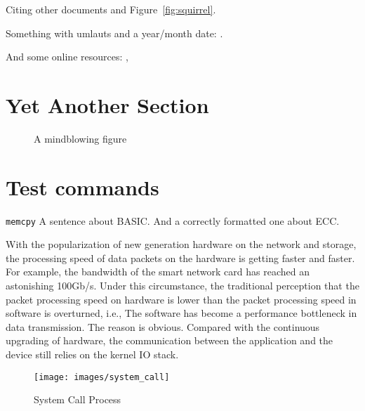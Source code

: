 Citing \cite{bellard2005qfa} other documents \cite{bellard2005qfa, boileau06}
and Figure~\ref{fig:squirrel}.

Something with umlauts and a year/month date:
\cite{becher04:_feurig_hacken_mit_firew}.

And some online resources: \cite{green04}, \cite{patent:4819234}

\section{Yet Another Section}


\begin{figure}[tbp]
 \caption{A mindblowing figure}
 \label{fig:todo}
\end{figure}

\section{Test commands}

\drops \LLinux \NOVA \QEMU
\texttt{memcpy}
A sentence about BASIC. And a correctly formatted one about ECC\@.



With the popularization of new generation hardware on the network and storage, the processing speed 
of data packets on the hardware is getting faster and faster. For example, the bandwidth of the smart
network card has reached an astonishing 100Gb/s. Under this circumstance, the traditional perception
 that the packet processing speed on hardware is lower than the packet processing speed in software is overturned, i.e.,
The software has become a performance bottleneck in data transmission.
The reason is obvious. Compared with the continuous upgrading of hardware, 
the communication between the application and the device still relies on the kernel IO stack. 

\begin{figure}[H]
  \centering
  \texttt{[image: images/system\_call]}
  \caption[Short description]{System Call Process}
  \label{fig:system_call_process}
\end{figure}
 
